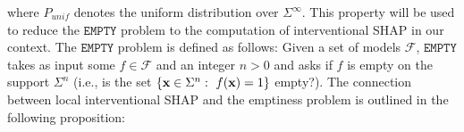 where $P_{unif}$ denotes the uniform distribution over $\Sigma^{\infty}$. This property will be used to reduce the $\texttt{EMPTY}$ problem to the computation of interventional SHAP in our context. The $\texttt{EMPTY}$ problem is defined as follows: Given a set of models $\mathcal{F}$, $\texttt{EMPTY}$ takes as input some $f \in \mathcal{F}$ and an integer $n > 0$ and asks if $f$ is empty on the support $\Sigma^{n}$ (i.e., is the set $\{ \textbf{x} \in \Sigma^{n}:~f(\textbf{x}) = 1 \}$ empty?). The connection between local interventional SHAP and the emptiness problem is outlined in the following proposition:





